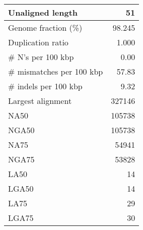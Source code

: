 \documentclass[12pt,a4paper]{article}
\begin{document}
\begin{table}[ht]
\begin{center}
\begin{tabular}{|l*{1}{|r}|}
Unaligned length & 51 \\ \hline
Genome fraction (\%) & 98.245 \\ \hline
Duplication ratio & 1.000 \\ \hline
\# N's per 100 kbp & 0.00 \\ \hline
\# mismatches per 100 kbp & 57.83 \\ \hline
\# indels per 100 kbp & 9.32 \\ \hline
Largest alignment & 327146 \\ \hline
NA50 & 105738 \\ \hline
NGA50 & 105738 \\ \hline
NA75 & 54941 \\ \hline
NGA75 & 53828 \\ \hline
LA50 & 14 \\ \hline
LGA50 & 14 \\ \hline
LA75 & 29 \\ \hline
LGA75 & 30 \\ \hline
\end{tabular}
\end{center}
\end{table}
\end{document}
